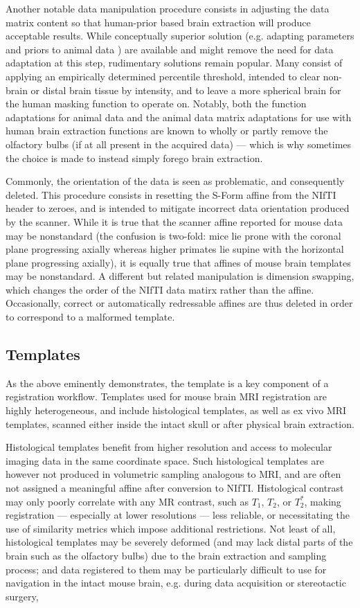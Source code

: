 Another notable data manipulation procedure consists in adjusting the data matrix content so that human-prior based brain extraction will produce acceptable results.
While conceptually superior solution (e.g. adapting parameters and priors to animal data \cite{rbet,Oguz2014}) are available and might remove the need for data adaptation at this step, rudimentary solutions remain popular.
Many consist of applying an empirically determined percentile threshold, intended to clear non-brain or distal brain tissue by intensity, and to leave a more spherical brain for the human masking function to operate on.
Notably, both the function adaptations for animal data and the animal data matrix adaptations for use with human brain extraction functions are known to wholly or partly remove the olfactory bulbs (if at all present in the acquired data) --- which is why sometimes the choice is made to instead simply forego brain extraction.

Commonly, the orientation of the data is seen as problematic, and consequently deleted.
This procedure consists in resetting the S-Form affine from the NIfTI header to zeroes, and is intended to mitigate incorrect data orientation produced by the scanner.
While it is true that the scanner affine reported for mouse data may be nonstandard (the confusion is two-fold: mice lie prone with the coronal plane progressing axially whereas higher primates lie supine with the horizontal plane progressing axially), it is equally true that affines of mouse brain templates may be nonstandard.
A different but related manipulation is dimension swapping, which changes the order of the NIfTI data matirx rather than the affine.
Occasionally, correct or automatically redressable affines are thus deleted in order to correspond to a malformed template.

\subsection{Templates}
As the above eminently demonstrates, the template is a key component of a registration workflow.
Templates used for mouse brain MRI registration are highly heterogeneous, and include histological templates, as well as ex vivo MRI templates, scanned either inside the intact skull or after physical brain extraction.

Histological templates benefit from higher resolution and access to molecular imaging data in the same coordinate space.
Such histological templates are however not produced in volumetric sampling analogous to MRI, and are often not assigned a meaningful affine after conversion to NIfTI.
Histological contrast may only poorly correlate with any MR contrast, such as $T_1$, $T_2$, or $T_2^*$, making registration --- especially at lower resolutions --- less reliable, or necessitating the use of similarity metrics which impose additional restrictions.
Not least of all, histological templates may be severely deformed (and may lack distal parts of the brain such as the olfactory bulbs) due to the brain extraction and sampling process;
and data registered to them may be particularly difficult to use for navigation in the intact mouse brain, e.g. during data acquisition or stereotactic surgery,

